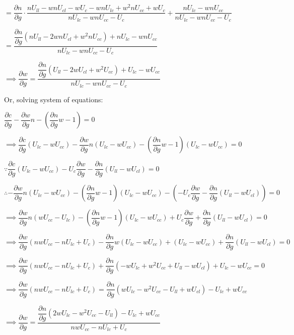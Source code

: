 \documentclass{article}
\begin{document}
$=\dfrac{\partial n}{\partial g}\cdot\dfrac{nU_{ll}-wnU_{cl}-wU_{c}-wnU_{lc}+w^{2}nU_{cc}+wU_{c}}{nU_{lc}-wnU_{cc}-U_{c}}+\dfrac{nU_{lc}-wnU_{cc}}{nU_{lc}-wnU_{cc}-U_{c}}$

$=\dfrac{\dfrac{\partial n}{\partial g}\left(nU_{ll}-2wnU_{cl}+w^{2}nU_{cc}\right)+nU_{lc}-wnU_{cc}}{nU_{lc}-wnU_{cc}-U_{c}}$

$\implies \dfrac{\partial w}{\partial g}=\dfrac{\dfrac{\partial n}{\partial g}\left(U_{ll}-2wU_{cl}+w^{2}U_{cc}\right)+U_{lc}-wU_{cc}}{nU_{lc}-wnU_{cc}-U_{c}}$

Or, solving system of equations:

$\dfrac{\partial c}{\partial g}-\dfrac{\partial w}{\partial g}n-\left(\dfrac{\partial n}{\partial g}w-1\right)=0$

$\implies \dfrac{\partial c}{\partial g}\left(U_{lc}-wU_{cc}\right)-\dfrac{\partial w}{\partial g}n\left(U_{lc}-wU_{cc}\right)-\left(\dfrac{\partial n}{\partial g}w-1\right)\left(U_{lc}-wU_{cc}\right)=0$

$\because\dfrac{\partial c}{\partial g}\left(U_{lc}-wU_{cc}\right)-U_{c}\dfrac{\partial w}{\partial g}-\dfrac{\partial n}{\partial g}\left(U_{ll}-wU_{cl}\right)=0$

$\therefore-\dfrac{\partial w}{\partial g}n\left(U_{lc}-wU_{cc}\right)-\left(\dfrac{\partial n}{\partial g}w-1\right)\left(U_{lc}-wU_{cc}\right)-\left(-U_{c}\dfrac{\partial w}{\partial g}-\dfrac{\partial n}{\partial g}\left(U_{ll}-wU_{cl}\right)\right)=0$

$\implies\dfrac{\partial w}{\partial g}n\left(wU_{cc}-U_{lc}\right)-\left(\dfrac{\partial n}{\partial g}w-1\right)\left(U_{lc}-wU_{cc}\right)+U_{c}\dfrac{\partial w}{\partial g}+\dfrac{\partial n}{\partial g}\left(U_{ll}-wU_{cl}\right)=0 $

$\implies \dfrac{\partial w}{\partial g}\left(nwU_{cc}-nU_{lc}+U_{c}\right)-\dfrac{\partial n}{\partial g}w\left(U_{lc}-wU_{cc}\right)+\left(U_{lc}-wU_{cc}\right)+\dfrac{\partial n}{\partial g}\left(U_{ll}-wU_{cl}\right)=0$

$\implies \dfrac{\partial w}{\partial g}\left(nwU_{cc}-nU_{lc}+U_{c}\right)+\dfrac{\partial n}{\partial g}\left(-wU_{lc}+w^2U_{cc}+U_{ll}-wU_{cl}\right)+U_{lc}-wU_{cc}=0$

$\implies \dfrac{\partial w}{\partial g}\left(nwU_{cc}-nU_{lc}+U_{c}\right)=\dfrac{\partial n}{\partial g}\left(wU_{lc}-w^2U_{cc}-U_{ll}+wU_{cl}\right)-U_{lc}+wU_{cc}$

$\implies \dfrac{\partial w}{\partial g}=\dfrac{\dfrac{\partial n}{\partial g}\left(2wU_{lc}-w^2U_{cc}-U_{ll}\right)-U_{lc}+wU_{cc}}{nwU_{cc}-nU_{lc}+U_{c}}$
\end{document}
